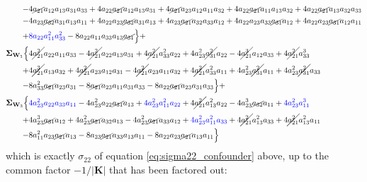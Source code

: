 \documentclass{article}
\begin{document}
\begin{equation}
\begin{aligned}
-& 4 \cancel{a_{21}} a_{12} a_{13} a_{31} a_{33} + 4 a_{22} \cancel{a_{21}} a_{12} a_{13} a_{31} + 4 \cancel{a_{21}} a_{23} a_{12} a_{11} a_{32} + 4 a_{22} \cancel{a_{21}} a_{11} a_{13} a_{32} + 4 a_{22} \cancel{a_{21}} a_{13} a_{32} a_{33} \\
-& 4 a_{23} \cancel{a_{32}} a_{31}a_{13} a_{11} + 4 a_{22} a_{23} \cancel{a_{32}} a_{31} a_{13} + 4 a_{23} \cancel{a_{21}} a_{32} a_{33} a_{12} + 4 a_{22} a_{23} a_{33} \cancel{a_{31}} a_{12} + 4 a_{22} a_{23} \cancel{a_{31}} a_{12} a_{11} \\
+& \textcolor{blue}{8 a_{22} a_{11}^{2} a_{33}^{2}} - 8 a_{22} a_{11} a_{33} a_{13} \cancel{a_{31}}\Bigr\} + \\
\mathbf{\Sigma}_{\textbf{W}_{1}} \Bigl\{& 4 \cancel{a_{21}^{2}} a_{22} a_{11} a_{33} - 4 \cancel{a_{21}^{2}} a_{22} a_{13} a_{31} + 4 \cancel{a_{21}^{2}} a_{33}^{2} a_{22} + 4 a_{23}^{2} \cancel{a_{31}^{2}} a_{22} - 4 \cancel{a_{21}^{3}} a_{12} a_{33} + 4 \cancel{a_{21}^{2}} a_{33}^{3} \\
+& 4 \cancel{a_{21}^{3}} a_{13} a_{32} + 4 \cancel{a_{21}^{2}} a_{23} a_{12} a_{31} - 4 \cancel{a_{21}^{2}} a_{23} a_{11} a_{32} + 4 \cancel{a_{21}^{2}} a_{33}^{2} a_{11} + 4 a_{23}^{2} \cancel{a_{31}^{2}} a_{11} + 4 a_{23}^{2} \cancel{a_{31}^{2}} a_{33} \\
-& 8 a_{33}^{2} \cancel{a_{21}} a_{23} a_{31} - 8 \cancel{a_{21}} a_{23} a_{11} a_{31} a_{33} - 8 a_{22} \cancel{a_{21}} a_{23} a_{31} a_{33}\Bigr\} + \\
\mathbf{\Sigma}_{\textbf{W}_{3}} \Bigl\{& \textcolor{blue}{4 a_{23}^{2} a_{22} a_{33} a_{11}} - 4 a_{23}^{2} a_{22} \cancel{a_{31}} a_{13} + \textcolor{blue}{4 a_{23}^{2} a_{11}^{2} a_{22}} + 4 \cancel{a_{21}^{2}} a_{13}^{2} a_{22} - 4 a_{23}^{3} \cancel{a_{32}} a_{11} + \textcolor{blue}{4 a_{23}^{2} a_{11}^{3}} \\
+& 4 a_{23}^{3} \cancel{a_{31}} a_{12} + 4 a_{23}^{2} \cancel{a_{21}} a_{32} a_{13} - 4 a_{23}^{2} \cancel{a_{21}} a_{33} a_{12} + \textcolor{blue}{4 a_{23}^{2} a_{11}^{2} a_{33}} + 4 \cancel{a_{21}^{2}} a_{13}^{2} a_{33} + 4 \cancel{a_{21}^{2}} a_{13}^{2} a_{11} \\
-& 8 a_{11}^{2} a_{23} \cancel{a_{21}} a_{13} - 8 a_{23} \cancel{a_{21}} a_{33} a_{13} a_{11} - 8 a_{22} a_{23} \cancel{a_{21}} a_{13} a_{11}\Bigr\}
\end{aligned}
\end{equation}
which is exactly $\sigma_{22}$ of equation \ref{eq:sigma22_confounder} above, up to the common factor $-1/|\mathbf{K}|$ that has been factored out:
\end{document}
